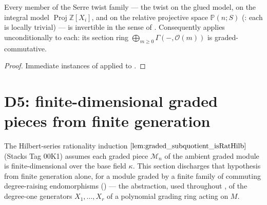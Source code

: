 \begin{corollary}
  \label{cor:serreTwist_isInvertibleGr}
  \leanok
  Every member of the Serre twist family --- the twist on the glued
  model, on the integral model \(\operatorname{Proj}\mathbb{Z}[X_i]\),
  and on the relative projective space \(\mathbb{P}(n; S)\)
  (: each is locally trivial) ---
  is invertible in the sense of . Consequently
   applies unconditionally to
  each: its section ring \(\bigoplus_{m \ge 0} \Gamma(-, \mathcal{O}(m))\)
  is graded-commutative.
\end{corollary}
\begin{proof}
  \leanok
  Immediate instances of 
  applied to .
\end{proof}

\section{D5: finite-dimensional graded pieces from finite generation}
\label{sec:sgr_graded_pieces_finite}

The Hilbert-series rationality induction \(\Cref{lem:graded_subquotient_isRatHilb}\)
(Stacks Tag 00K1) assumes each graded piece \(\mathcal{M}_n\) of the ambient
graded module is finite-dimensional over the base field \(\kappa\). This
section discharges that hypothesis from finite generation alone, for a
module graded by a finite family of commuting degree-raising endomorphisms
() --- the abstraction, used throughout
, of the degree-one generators \(X_1,
\dots, X_r\) of a polynomial grading ring acting on \(M\).

